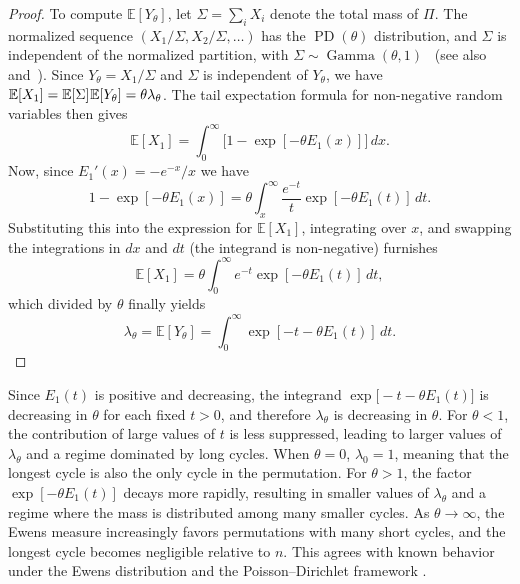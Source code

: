\documentclass{amsart}
\theoremstyle{definition}
\theoremstyle{remark}
\numberwithin{equation}{section}
\newcommand{\mku}{\mkern1mu}
\newcommand{\EE}{\mathbb{E}}
\DeclareMathOperator{\Gam}{Gamma}
\DeclareMathOperator{\PD}{PD}
\begin{document}
\begin{proof}
To compute $\EE[Y_{\theta}]$, let $\Sigma = \sum_{i}X_{i}$ denote the total mass of $\Pi$. The normalized sequence $(X_{1}/\Sigma, X_{2}/\Sigma, \dots)$ has the $\PD(\theta)$ distribution, and $\Sigma$ is independent of the normalized partition, with $\Sigma \sim \Gam(\theta,1)$~\cite{Kingman1975,Kingman1993} (see also \cite[\S3.2]{Pitman2006} and~\cite{TerryTao2013}). Since $Y_{\theta} = X_{1}/\Sigma$ and $\Sigma$ is independent of $Y_{\theta}$, we have $\EE[X_{1}] = \EE[\Sigma]\mku\EE[Y_{\theta}] = \theta\lambda_{\theta}$. The tail expectation formula for non-negative random variables then gives
\begin{equation}
\EE[X_{1}] = \int_{0}^{\infty} \bigl[1-\exp[-\theta E_{1}(x)]\bigr]\,dx.
\end{equation}
Now, since $E_{1}'(x) = -e^{-x}/x$ we have
\begin{equation}
1-\exp[-\theta E_{1}(x)] = 
\theta \int_{x}^{\infty} \frac{e^{-t}}{t}\exp[-\theta E_{1}(t)]\,dt.
\end{equation}
Substituting this into the expression for $\EE[X_{1}]$, integrating over $x$, and swapping the integrations in $dx$ and $dt$ (the integrand is non-negative) furnishes
\begin{equation}
\EE[X_{1}] = \theta \int_{0}^{\infty} e^{-t} \exp[-\theta E_{1}(t)]\,dt,
\end{equation}
which divided by $\theta$ finally yields
\begin{equation}
\label{eq:ggd}
\lambda_{\theta} = \EE[Y_{\theta}] = \int_{0}^{\infty} \exp[-t-\theta E_{1}(t)]\,dt.
\end{equation}
\end{proof}

Since $E_{1}(t)$ is positive and decreasing, the integrand $\exp\bigl[-t-\theta E_{1}(t)\bigr]$ is decreasing in $\theta$ for each fixed $t>0$, and therefore $\lambda_{\theta}$ is decreasing in $\theta$. For $\theta<1$, the contribution of large values of $t$ is less suppressed, leading to larger values of $\lambda_{\theta}$ and a regime dominated by long cycles. When $\theta=0$, $\lambda_{0}=1$, meaning that the longest cycle is also the only cycle in the permutation. For $\theta > 1$, the factor $\exp[-\theta E_{1}(t)]$ decays more rapidly, resulting in smaller values of $\lambda_{\theta}$ and a regime where the mass is distributed among many smaller cycles. As $\theta \to \infty$, the Ewens measure increasingly favors permutations with many short cycles, and the longest cycle becomes negligible relative to $n$. This agrees with known behavior under the Ewens distribution and the Poisson–Dirichlet framework \cite{ABT2003,Arratia1992,Ercolani2014,Ford2022,Holst2001,Pitman2006}.
\end{document}
